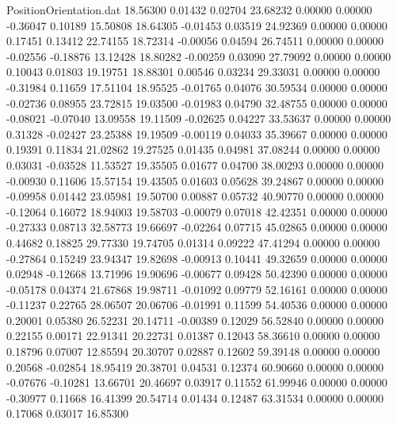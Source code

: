 \begin{filecontents}{PositionOrientation.dat}
  18.56300    0.01432    0.02704    23.68232    0.00000    0.00000   -0.36047    0.10189   15.50808
  18.64305   -0.01453    0.03519    24.92369    0.00000    0.00000    0.17451    0.13412   22.74155
  18.72314   -0.00056    0.04594    26.74511    0.00000    0.00000   -0.02556   -0.18876   13.12428
  18.80282   -0.00259    0.03090    27.79092    0.00000    0.00000    0.10043    0.01803   19.19751
  18.88301    0.00546    0.03234    29.33031    0.00000    0.00000   -0.31984    0.11659   17.51104
  18.95525   -0.01765    0.04076    30.59534    0.00000    0.00000   -0.02736    0.08955   23.72815
  19.03500   -0.01983    0.04790    32.48755    0.00000    0.00000   -0.08021   -0.07040   13.09558
  19.11509   -0.02625    0.04227    33.53637    0.00000    0.00000    0.31328   -0.02427   23.25388
  19.19509   -0.00119    0.04033    35.39667    0.00000    0.00000    0.19391    0.11834   21.02862
  19.27525    0.01435    0.04981    37.08244    0.00000    0.00000    0.03031   -0.03528   11.53527
  19.35505    0.01677    0.04700    38.00293    0.00000    0.00000   -0.00930    0.11606   15.57154
  19.43505    0.01603    0.05628    39.24867    0.00000    0.00000   -0.09958    0.01442   23.05981
  19.50700    0.00887    0.05732    40.90770    0.00000    0.00000   -0.12064    0.16072   18.94003
  19.58703   -0.00079    0.07018    42.42351    0.00000    0.00000   -0.27333    0.08713   32.58773
  19.66697   -0.02264    0.07715    45.02865    0.00000    0.00000    0.44682    0.18825   29.77330
  19.74705    0.01314    0.09222    47.41294    0.00000    0.00000   -0.27864    0.15249   23.94347
  19.82698   -0.00913    0.10441    49.32659    0.00000    0.00000    0.02948   -0.12668   13.71996
  19.90696   -0.00677    0.09428    50.42390    0.00000    0.00000   -0.05178    0.04374   21.67868
  19.98711   -0.01092    0.09779    52.16161    0.00000    0.00000   -0.11237    0.22765   28.06507
  20.06706   -0.01991    0.11599    54.40536    0.00000    0.00000    0.20001    0.05380   26.52231
  20.14711   -0.00389    0.12029    56.52840    0.00000    0.00000    0.22155    0.00171   22.91341
  20.22731    0.01387    0.12043    58.36610    0.00000    0.00000    0.18796    0.07007   12.85594
  20.30707    0.02887    0.12602    59.39148    0.00000    0.00000    0.20568   -0.02854   18.95419
  20.38701    0.04531    0.12374    60.90660    0.00000    0.00000   -0.07676   -0.10281   13.66701
  20.46697    0.03917    0.11552    61.99946    0.00000    0.00000   -0.30977    0.11668   16.41399
  20.54714    0.01434    0.12487    63.31534    0.00000    0.00000    0.17068    0.03017   16.85300

\end{filecontents}
